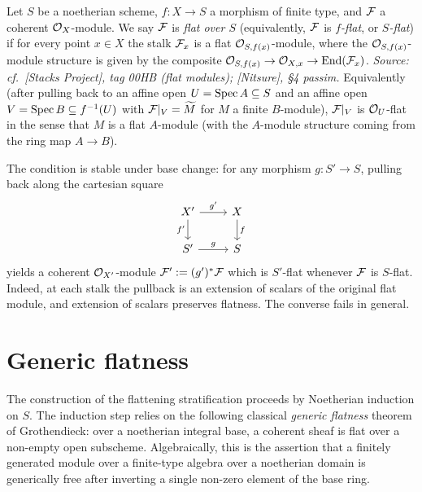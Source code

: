 \begin{definition}\leanok
  \label{def:coherent_sheaf_flat}
  Let \(S\) be a noetherian scheme, \(f : X \to S\) a morphism of finite type, and
  \(\mathcal{F}\) a coherent \(\mathcal{O}_X\)-module.  We say \(\mathcal{F}\) is \emph{flat over \(S\)}
  (equivalently, \(\mathcal{F}\) is \emph{\(f\)-flat}, or \emph{\(S\)-flat}) if for every
  point \(x \in X\) the stalk \(\mathcal{F}_x\) is a flat \(\mathcal{O}_{S, f(x)}\)-module, where the
  \(\mathcal{O}_{S, f(x)}\)-module structure is given by the composite
  \(\mathcal{O}_{S, f(x)} \to \mathcal{O}_{X, x} \to \operatorname{End}(\mathcal{F}_x)\).
  \textit{Source: cf.\ [Stacks Project], tag 00HB (flat modules); [Nitsure], \S4
  passim.}
  Equivalently (after pulling back to an affine open \(U = \operatorname{Spec} A \subseteq S\) and
  an affine open \(V = \operatorname{Spec} B \subseteq f^{-1}(U)\) with \(\mathcal{F}|_V = \widetilde{M}\)
  for \(M\) a finite \(B\)-module), \(\mathcal{F}|_V\) is \(\mathcal{O}_U\)-flat in the sense that \(M\) is a
  flat \(A\)-module (with the \(A\)-module structure coming from the ring map
  \(A \to B\)).
\end{definition}

\begin{remark}
\label{rem:coh_flat_pullback}
  The condition is stable under base change: for any morphism \(g : S' \to S\),
  pulling back along the cartesian square
  \[
    \begin{tikzcd}
      X' \ar[r, "g'"] \ar[d, "f'"'] & X \ar[d, "f"] \\
      S' \ar[r, "g"]                & S
    \end{tikzcd}
  \]
  yields a coherent \(\mathcal{O}_{X'}\)-module \(\mathcal{F}' := (g')^* \mathcal{F}\) which is \(S'\)-flat
  whenever \(\mathcal{F}\) is \(S\)-flat.  Indeed, at each stalk the pullback is an
  extension of scalars of the original flat module, and extension of scalars
  preserves flatness. The converse fails in general.
\end{remark}

\section{Generic flatness}
\label{sec:generic_flatness}

The construction of the flattening stratification proceeds by Noetherian
induction on \(S\). The induction step relies on the following classical
\emph{generic flatness} theorem of Grothendieck: over a noetherian integral
base, a coherent sheaf is flat over a non-empty open subscheme. Algebraically,
this is the assertion that a finitely generated module over a finite-type
algebra over a noetherian domain is generically free after inverting a single
non-zero element of the base ring.

